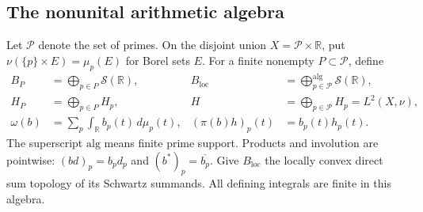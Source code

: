 \documentclass[11pt]{article}
\theoremstyle{definition}
\theoremstyle{remark}
\numberwithin{equation}{section}
\newcommand{\R}{\mathbb R}
\begin{document}
\subsection{The nonunital arithmetic algebra}

Let $\mathcal P$ denote the set of primes.  On the disjoint union
$X=\mathcal P\times\R$, put
$\nu(\{p\}\times E)=\mu_p(E)$ for Borel sets $E$.
For a finite nonempty $P\subset\mathcal P$, define
\begin{equation}
 \begin{aligned}
 B_P&=\bigoplus_{p\in P}\mathscr S(\R),&
 B_{\mathrm{loc}}&=\bigoplus_{p\in\mathcal P}^{\mathrm{alg}}\mathscr S(\R),\\
 H_P&=\bigoplus_{p\in P}H_p,&
 H&=\bigoplus_{p\in\mathcal P}H_p=L^2(X,\nu),\\
 \omega(b)&=\sum_p\int_\R b_p(t)\,d\mu_p(t),&
 (\pi(b)h)_p(t)&=b_p(t)h_p(t).
 \end{aligned}
 \label{eq:wc-local-algebra}
\end{equation}
The superscript $\mathrm{alg}$ means finite prime support.
Products and involution are pointwise:
$(bd)_p=b_pd_p$ and $(b^*)_p=\overline{b_p}$.
Give $B_{\mathrm{loc}}$ the locally convex direct sum topology of its
Schwartz summands.  All defining integrals are finite in this algebra.
\end{document}
